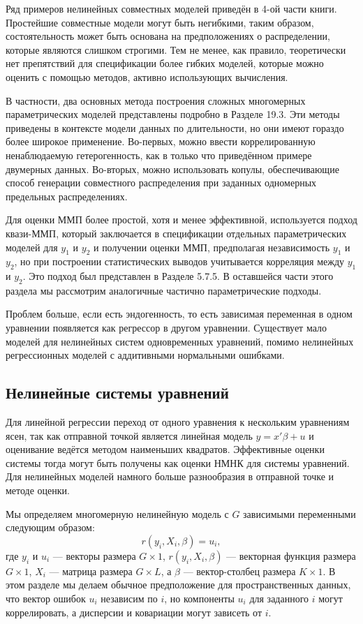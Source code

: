 Ряд примеров нелинейных совместных моделей приведён в 4-ой части книги. Простейшие совместные модели могут быть негибкими, таким образом, состоятельность может быть основана на предположениях о распределении, которые являются слишком строгими. Тем не менее, как правило, теоретически нет препятствий для спецификации более гибких моделей, которые можно оценить с помощью методов, активно использующих вычисления.

В частности, два основных метода построения сложных многомерных параметрических моделей представлены подробно в Разделе 19.3. Эти методы приведены в контексте модели данных по длительности, но они имеют гораздо более широкое применение. Во-первых, можно ввести коррелированную ненаблюдаемую гетерогенность, как в только что приведённом примере двумерных данных. Во-вторых, можно использовать копулы, обеспечивающие способ генерации совместного распределения при заданных  одномерных предельных распределениях.

Для оценки ММП более простой, хотя и менее эффективной, используется подход квази-ММП, который заключается в спецификации отдельных параметрических моделей для $y_1$ и $y_2$ и получении оценки ММП, предполагая независимость $y_1$ и $y_2$, но при построении статистических выводов учитывается корреляция между $y_1$ и $y_2$. Это подход был  представлен в Разделе 5.7.5. В оставшейся части этого раздела мы рассмотрим аналогичные частично параметрические подходы.

Проблем больше, если есть эндогенность, то есть зависимая переменная в одном уравнении появляется как регрессор в другом уравнении. Существует мало моделей для нелинейных систем одновременных уравнений, помимо нелинейных регрессионных моделей с аддитивными нормальными ошибками.

\subsection{Нелинейные системы уравнений}

Для линейной регрессии переход от одного уравнения к нескольким уравнениям ясен, так как отправной точкой является линейная модель $y=x' \beta +u $ и оценивание ведётся методом наименьших квадратов. Эффективные оценки системы тогда могут быть получены как оценки  НМНК для системы уравнений. Для нелинейных моделей намного больше разнообразия в отправной точке и методе оценки.

Мы определяем многомерную нелинейную модель с $G$ зависимыми переменными следующим образом:
\begin{equation}
r(y_i,X_i,\beta)=u_i,
\end{equation}
где $y_i$ и $u_i$ --- векторы размера $G \times 1$, $r(y_i,X_i,\beta)$ --- векторная функция размера $G \times 1$, $X_i$ --- матрица размера $G \times L$, а $\beta$ --- вектор-столбец размера $K \times 1$. В этом разделе мы делаем обычное  предположение для пространственных данных, что вектор ошибок $u_i$ независим по $i$, но компоненты $u_i$ для заданного $i$ могут коррелировать, а дисперсии и ковариации могут зависеть от $i$.

